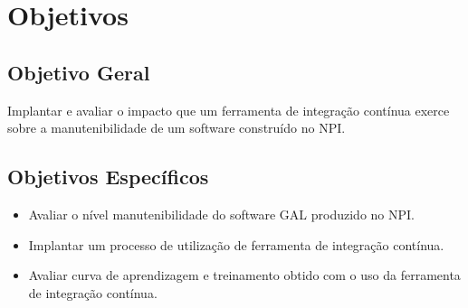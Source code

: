 \chapter{Objetivos}\label{objetivos}
\section{Objetivo Geral}\label{objetivoger}
Implantar e avaliar o impacto que um ferramenta de integração contínua exerce sobre a manutenibilidade de um software construído no NPI.

\section{Objetivos Específicos}

\begin{itemize}
\item Avaliar o nível manutenibilidade do software GAL produzido no NPI.
\item Implantar um processo de utilização de ferramenta de integração contínua.
\item Avaliar curva de aprendizagem e treinamento obtido com o uso da ferramenta de integração contínua.
\end{itemize}